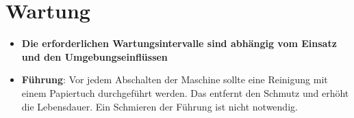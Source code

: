 %
%

\chapter{Wartung}
\begin{itemize}
	\item \textbf{Die erforderlichen Wartungsintervalle sind abhängig vom Einsatz und den Umgebungseinflüssen}
	\item \textbf{Führung}: Vor jedem Abschalten der Maschine sollte eine Reinigung mit einem  Papiertuch durchgeführt werden. Das entfernt den Schmutz und erhöht die Lebensdauer. Ein Schmieren der Führung ist nicht notwendig.
\end{itemize}
